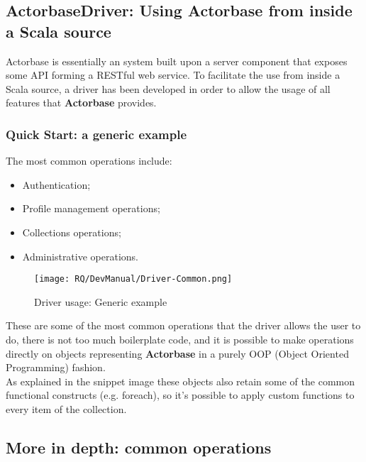 \documentclass{scalatekids-article}
\begin{document}

\subsection{ActorbaseDriver: Using Actorbase from inside a Scala source}

Actorbase is essentially an  system built upon a server component that
exposes some API forming a RESTful web service. To facilitate the use from
inside a Scala source, a driver has been developed in order to allow the
usage of all features that \textbf{Actorbase} provides.\\

\subsubsection{Quick Start: a generic example}

The most common operations include:
\begin{itemize}
\item Authentication;
\item Profile management operations;
\item Collections operations;
\item Administrative operations.
\end{itemize}

\begin{figure}[H]
  \begin{center}
    \texttt{[image: RQ/DevManual/Driver-Common.png]}
    \caption{Driver usage: Generic example}
  \end{center}
\end{figure}

These are some of the most common operations that the driver allows the user to do,
there is not too much boilerplate code, and it is possible
to make operations directly on objects representing \textbf{Actorbase}
 in a purely OOP (Object Oriented Programming) fashion.\\
As explained in the snippet image these objects also retain some of the common functional constructs (e.g.
foreach), so it's possible to apply custom functions to every item of the
collection.

\subsection{More in depth: common operations}
\end{document}
